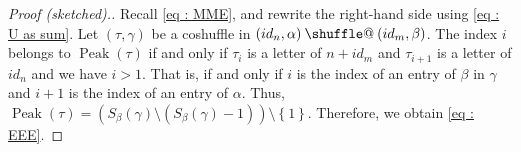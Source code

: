 \documentclass[numbers=enddot,12pt,final,onecolumn,notitlepage]{scrartcl}%
\makeatletter
\newcommand{\al}{\alpha}
\newcommand{\be}{\beta}
\newcommand{\Peak}{\operatorname{Peak}}
\providecommand*{\shuffle}{%
  \mathbin{\mathpalette\shuffle@{}}%
}
\newcommand*{\shuffle@}[2]{%
  \sbox0{$#1\vcenter{}$}%
  \kern .15\ht0 %
  \rlap{\vrule height .25\ht0 depth 0pt width 2.5\ht0}%
  \raise.1\ht0\hbox to 2.5\ht0{%
    \vrule height 1.75\ht0 depth -.1\ht0 width .17\ht0 %
    \hfill
    \vrule height 1.75\ht0 depth -.1\ht0 width .17\ht0 %
    \hfill
    \vrule height 1.75\ht0 depth -.1\ht0 width .17\ht0 %
  }%
  \kern .15\ht0 %
}
\newcommand{\0}{\phantom{c}}
\makeatother
\begin{document}
\begin{proof}[Proof (sketched).]
Recall \eqref{eq : MME}, and rewrite the right-hand side using \eqref{eq : U as sum}.
Let $(\tau,\gamma)$ be a coshuffle in $(id_n,\al)\shuffle(id_m,\be)$. The index $i$ belongs to $\Peak(\tau)$ if and only if $\tau_i$ is a letter of $n+id_m$ and $\tau_{i+1}$ is a letter of $id_n$ and we have $i > 1$. That is, if and only if $i$ is the index of an entry of $\beta$ in $\gamma$ and $i+1$ is the index of an entry of $\al$.
Thus, $\Peak(\tau) = \left(S_{\be}(\gamma)\setminus (S_{\be}(\gamma)-1)\right) \setminus \left\{1\right\}$.
Therefore, we obtain \eqref{eq : EEE}.
\end{proof}
\printbibliography
\end{document}
